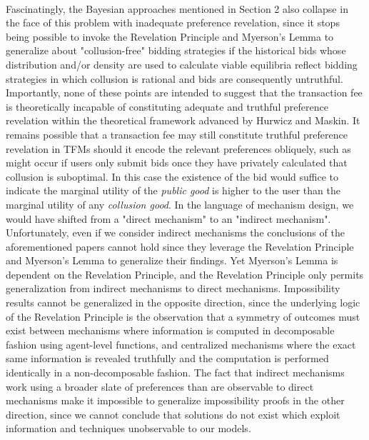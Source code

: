 \documentclass[11pt,a4paper]{llncs}
\begin{document}
\vspace{0.2cm} \\
Fascinatingly, the Bayesian approaches mentioned in Section 2 also collapse in the face of this problem with inadequate preference revelation, since it stops being possible to invoke the Revelation Principle and Myerson's Lemma to generalize about "collusion-free" bidding strategies if the historical bids whose distribution and/or density are used to calculate viable equilibria reflect bidding strategies in which collusion is rational and bids are consequently untruthful.
\vspace{0.2cm} \\
Importantly, none of these points are intended to suggest that the transaction fee is theoretically incapable of constituting adequate and truthful preference revelation within the theoretical framework advanced by Hurwicz and Maskin. It remains possible that a transaction fee may still constitute truthful preference revelation in TFMs should it encode the relevant preferences obliquely, such as might occur if users only submit bids once they have privately calculated that collusion is suboptimal. In this case the existence of the bid would suffice to indicate the marginal utility of the \textit{public good} is higher to the user than the marginal utility of any \textit{collusion good}. In the language of mechanism design, we would have shifted from a "direct mechanism" to an "indirect mechanism".
\vspace{0.2cm} \\
Unfortunately, even if we consider indirect mechanisms the conclusions of the aforementioned papers cannot hold since they leverage the Revelation Principle and Myerson's Lemma to generalize their findings. Yet Myerson's Lemma is dependent on the Revelation Principle, and the Revelation Principle only permits generalization from indirect mechanisms to direct mechanisms. Impossibility results cannot be generalized in the opposite direction, since the underlying logic of the Revelation Principle is the observation that a symmetry of outcomes must exist between mechanisms where information is computed in decomposable fashion using agent-level functions, and centralized mechanisms where the exact same information is revealed truthfully and the computation is performed identically in a non-decomposable fashion. The fact that indirect mechanisms work using a broader slate of preferences than are observable to direct mechanisms make it impossible to generalize impossibility proofs in the other direction, since we cannot conclude that solutions do not exist which exploit information and techniques unobservable to our models.
\end{document}
